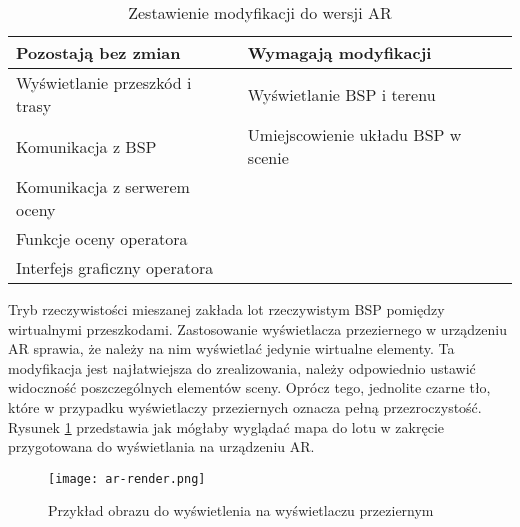 \begin{table}[!h] \centering
    \caption{Zestawienie modyfikacji do wersji AR}
    \label{tab:modyfikacje-ar}

    \begin{tabular} {| l | l |} \hline
        \textbf{Pozostają bez zmian} & \textbf{Wymagają modyfikacji} \\ \hline\hline
        Wyświetlanie przeszkód i trasy & Wyświetlanie BSP i terenu \\ \hline
        Komunikacja z BSP & Umiejscowienie układu BSP w scenie \\ \hline
        Komunikacja z serwerem oceny &  \\ \hline
        Funkcje oceny operatora &  \\ \hline
        Interfejs graficzny operatora &  \\ \hline
    \end{tabular}
\end{table}

Tryb rzeczywistości mieszanej zakłada lot rzeczywistym BSP pomiędzy wirtualnymi przeszkodami. Zastosowanie wyświetlacza przeziernego w urządzeniu AR sprawia, że należy na nim wyświetlać jedynie wirtualne elementy. Ta modyfikacja jest najłatwiejsza do zrealizowania, należy odpowiednio ustawić widoczność poszczególnych elementów sceny. Oprócz tego, jednolite czarne tło, które w przypadku wyświetlaczy przeziernych oznacza pełną przezroczystość. Rysunek \ref{fig:ar-render} przedstawia jak mógłaby wyglądać mapa do lotu w zakręcie przygotowana do wyświetlania na urządzeniu AR.

\begin{figure}[!h]
    \centering \texttt{[image: ar-render.png]}
    \caption{Przykład obrazu do wyświetlenia na wyświetlaczu przeziernym}
    \label{fig:ar-render}
\end{figure}


